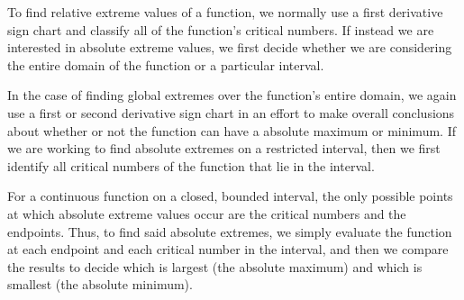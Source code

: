 \begin{summary}
\item To find relative extreme values of a function, we normally use a first derivative sign chart and classify all of the function's critical numbers.  If instead we are interested in absolute extreme values, we first decide whether we are considering the entire domain of the function or a particular interval.  
\item In the case of finding global extremes over the function's entire domain, we again use a first or second derivative sign chart in an effort to make overall conclusions about whether or not the function can have a absolute maximum or minimum.
If we are working to find absolute extremes on a restricted interval, then we first identify all critical numbers of the function that lie in the interval.
\item For a continuous function on a closed, bounded interval, the only possible points at which absolute extreme values occur are the critical numbers and the endpoints.  Thus, to find said absolute extremes, we simply evaluate the function at each endpoint and each critical number in the interval, and then we compare the results to decide which is largest (the absolute maximum) and which is smallest (the absolute minimum). 
\end{summary}

\nin \hrulefill

 

\clearpage
